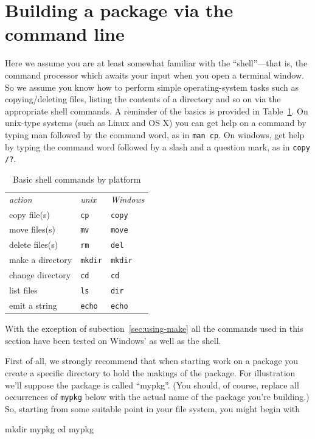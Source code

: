 \documentclass[oneside]{book}
\begin{document}

\section{Building a package via the command line}
\label{sec:cli-build}

Here we assume you are at least somewhat familiar with the
``shell''---that is, the command processor which awaits your input
when you open a terminal window. So we assume you know how to perform
simple operating-system tasks such as copying/deleting files, listing
the contents of a directory and so on via the appropriate shell
commands. A reminder of the basics is provided in
Table~\ref{tab:basics}. On unix-type systems (such as Linux and OS X)
you can get help on a command by typing man followed by the command
word, as in \texttt{man cp}. On windows, get help by typing the
command word followed by a slash and a question mark, as in
\texttt{copy /?}.

\begin{table}[htbp]
\centering
\begin{tabular}{lll}
\textit{action} & \textit{unix} & \textit{Windows} \\[4pt]
copy file(s) & \texttt{cp} & \texttt{copy} \\
move files(s) & \texttt{mv} & \texttt{move} \\
delete files(s) & \texttt{rm} & \texttt{del} \\
make a directory & \texttt{mkdir} & \texttt{mkdir} \\
change directory & \texttt{cd} & \texttt{cd} \\
list files & \texttt{ls} & \texttt{dir} \\
emit a string & \texttt{echo} & \texttt{echo}
\end{tabular}
\caption{Basic shell commands by platform}
\label{tab:basics}
\end{table}

With the exception of subection~\ref{sec:using-make} all the commands
used in this section have been tested on Windows'  as
well as the  shell.

First of all, we strongly recommend that when starting work on a
package you create a specific directory to hold the makings of the
package. For illustration we'll suppose the package is called
``mypkg''. (You should, of course, replace all occurrences of
\texttt{mypkg} below with the actual name of the package you're
building.) So, starting from some suitable point in your file system,
you might begin with
%
\begin{code}
mkdir mypkg
cd mypkg
\end{code}
\end{document}
